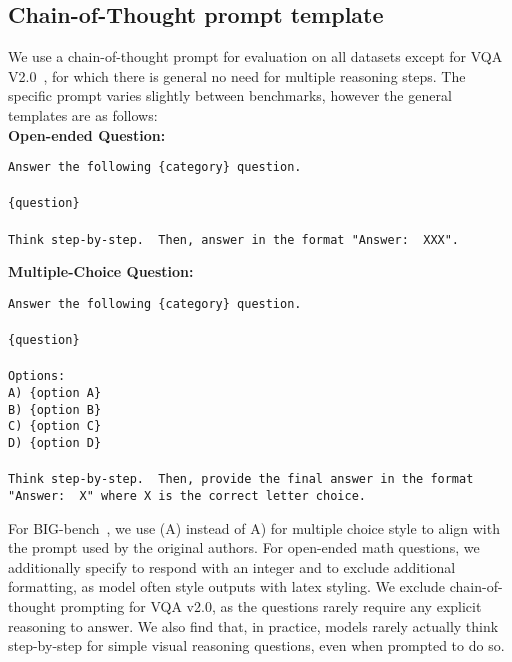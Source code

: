 \subsection{Chain-of-Thought prompt template} \label{app:template}
We use a chain-of-thought prompt for evaluation on all datasets except for VQA V2.0~\citep{goyal2017making}, for which there is general no need for multiple reasoning steps. The specific prompt varies slightly between benchmarks, however the general templates are as follows:\\

\noindent\textbf{Open-ended Question:}
\begin{tcolorbox}[colback=gray!6, colframe=gray!50, arc=2mm, boxrule=0.5pt]
    \texttt{Answer the following \{category\} question.\\\\
    \{question\}\\\\
    Think step-by-step.\textsf{ }Then, answer in the format "Answer:\textsf{ }XXX".}
\end{tcolorbox}

\vspace{\baselineskip}

\noindent\textbf{Multiple-Choice Question:}
\begin{tcolorbox}[colback=gray!6, colframe=gray!50, arc=2mm, boxrule=0.5pt]
    \texttt{Answer the following \{category\} question.\\\\
    \{question\}\\\\
    Options:\\
    A) \{option A\}\\
    B) \{option B\}\\
    C) \{option C\}\\
    D) \{option D\}\\\\
    Think step-by-step.\textsf{ }Then, provide the final answer in the format "Answer:\textsf{ }X" where X is the correct letter choice.}

\end{tcolorbox}

\vspace{\baselineskip}

\noindent For BIG-bench~\cite{srivastava2022beyond}, we use (A) instead of A) for multiple choice style to align with the prompt used by the original authors. For open-ended math questions, we additionally specify to respond with an integer and to exclude additional formatting, as model often style outputs with latex styling. We exclude chain-of-thought prompting for VQA v2.0, as the questions rarely require any explicit reasoning to answer. We also find that, in practice, models rarely actually think step-by-step for simple visual reasoning questions, even when prompted to do so.
